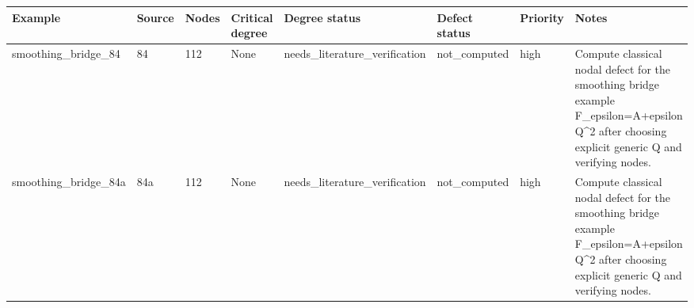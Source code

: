 \begin{tabular}{@{}p{2.6cm}p{1.6cm}p{1.5cm}p{1.9cm}p{1.6cm}p{2.4cm}p{1.2cm}p{5.6cm}@{}}
\toprule
Example & Source & Nodes & Critical degree & Degree status & Defect status & Priority & Notes \\
\midrule
smoothing_bridge_84 & 84 & 112 & None & needs_literature_verification & not_computed & high & Compute classical nodal defect for the smoothing bridge example F_epsilon=A+epsilon Q^2 after choosing explicit generic Q and verifying nodes. \\
smoothing_bridge_84a & 84a & 112 & None & needs_literature_verification & not_computed & high & Compute classical nodal defect for the smoothing bridge example F_epsilon=A+epsilon Q^2 after choosing explicit generic Q and verifying nodes. \\
\bottomrule
\end{tabular}

